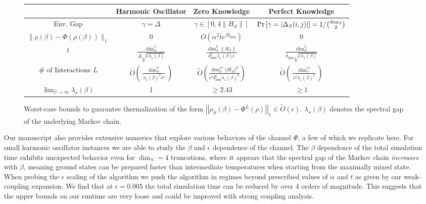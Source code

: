 \documentclass[11pt]{article}
\newcommand{\norm}[1]{\left|\left| #1 \right|\right|}
\newcommand{\bigotilde}[1]{\widetilde{O} \left( #1 \right)}
\begin{document}
\begin{figure}
\begin{center}
    \begin{tabular}{|c | c| c | c |}
        \hline 
        & Harmonic Oscillator & Zero Knowledge & Perfect Knowledge \\
        \hline \hline 
        Env. Gap & $\gamma = \Delta$ & $\gamma \in [0, 4 \| H_S \| ]$ & ${\rm Pr} \left[\gamma = |\Delta_S(i,j)|\right] = 1 / \binom{\dim_S}{2}$ \\
        \hline 
        $\|\rho(\beta) - \Phi(\rho(\beta)) \|_1$ & 0 & $ O \left( \alpha^2 t e^{\beta \delta_{\min}} \right)$ & 0 \\
        \hline 
        $t$ & $\frac{\dim_S^2}{\Delta \sqrt{\epsilon \lambda_\star(\beta)} }$ & $\frac{\dim_S^2 \|H_S\| }{\delta_{\min}^2  \lambda_\star(\beta) \epsilon }$ & $\frac{\dim_S^2}{\delta_{\min} \sqrt{\epsilon \lambda_\star(\beta)} }$ \\
        \hline
        \# of Interactions $L$ & $\bigotilde{\frac{\dim_S^8}{ \lambda_\star(\beta)^2 \epsilon^2 }}$ & $\bigotilde{\frac{\dim_S^{14} \norm{H_S}^6}{\epsilon^5 \delta_{\min}^6 {\lambda}_\star(\beta)^{6} }}$ & $\bigotilde{\frac{\dim_S^{14}}{\epsilon^2 {\lambda}_\star(\beta)^3}}$  \\
        \hline
        $\lim_{\beta \to \infty} \lambda_\star(\beta)$ & 1 & $\ge 2.43$ & $\ge 1$ \\
        \hline
    \end{tabular}
\end{center}
\caption{Worst-case bounds to guarantee thermalization of the form $\norm{\rho_S(\beta) - \Phi^L(\rho)}_1 \in \bigotilde{\epsilon}$. $\lambda_\star(\beta)$ denotes the spectral gap of the underlying Markov chain.}
\end{figure}

Our manuscript also provides extensive numerics that explore various behaviors of the channel $\Phi$, a few of which we replicate here. For small harmonic oscillator instances we are able to study the $\beta$ and $\epsilon$ dependence of the channel. The $\beta$ dependence of the total simulation time exhibits unexpected behavior even for $\dim_S = 4$ truncations, where it appears that the spectral gap of the Markov chain \emph{increases} with $\beta$, meaning ground states can be prepared faster than intermediate temperatures when starting from the maximally mixed state. When probing the $\epsilon$ scaling of the algorithm we push the algorithm in regimes beyond prescribed values of $\alpha$ and $t$ as given by our weak-coupling expansion. We find that at $\epsilon = 0.005$ the total simulation time can be reduced by over 4 orders of magnitude. This suggests that the upper bounds on our runtime are very loose and could be improved with strong coupling analysis. 
\end{document}
